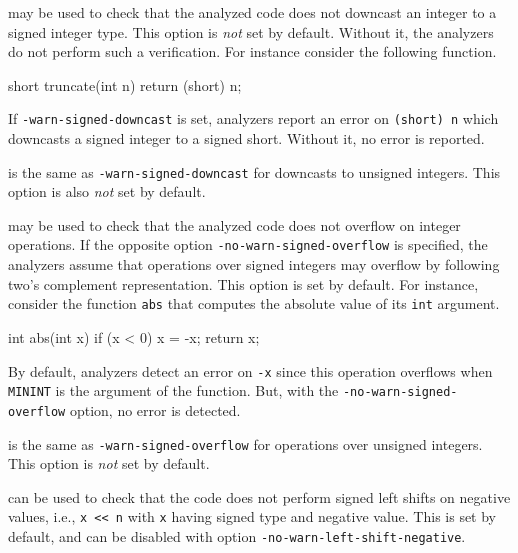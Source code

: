 \begin{description}
\item {} may be used to check that the analyzed
  code does not downcast an integer to a signed integer type. This option is
  \emph{not} set by default. Without it, the analyzers do not perform such a
  verification. For instance consider the following function.
\begin{ccode}
short truncate(int n) {
  return (short) n;
}
\end{ccode}
If \texttt{-warn-signed-downcast} is set, analyzers report an error on
{\lstset{language=C,style=frama-c-style} \lstinline|(short) n|}
which downcasts a signed integer to a signed
short. Without it, no error is reported.

\item {} is the same as
  \texttt{-warn-signed-downcast} for downcasts to unsigned integers. This option
  is also \emph{not} set by default.

\item {} may be used to check that the
  analyzed code does not overflow on integer operations. If the opposite option
  \texttt{-no-warn-signed-overflow} is specified, the analyzers assume that
  operations over signed integers may overflow by following two's complement
  representation. This option is set by default. For instance, consider the
  function \lstinline|abs| that computes the absolute value of its
  \lstinline|int| argument.
\begin{ccode}
int abs(int x) {
  if (x < 0) x = -x;
  return x;
}
\end{ccode}
By default, analyzers detect an error on
\lstinline|-x| since this operation overflows when \lstinline|MININT| is the
argument of the function. But, with the \texttt{-no-warn-signed-overflow}
option, no error is detected.

\item {} is the same as
  \texttt{-warn-signed-overflow} for operations over unsigned integers. This
  option is \emph{not} set by default.

\item {} can be used to check that the
  code does not perform signed left shifts on negative values, i.e.,
  \lstinline|x << n| with \lstinline|x| having signed type and negative
  value. This is set by default, and can be disabled with option
  \texttt{-no-warn-left-shift-negative}.


\end{description}
